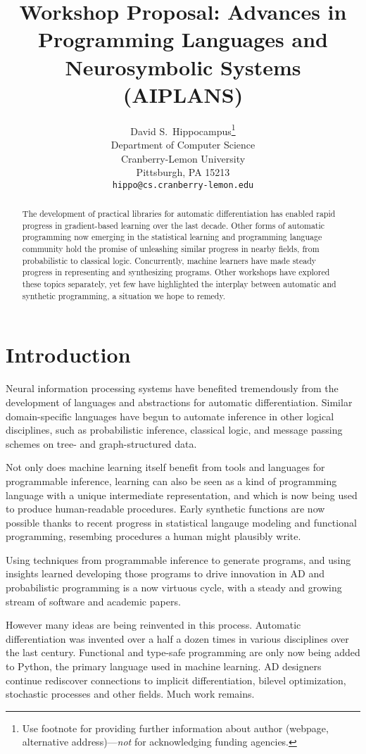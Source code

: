 \documentclass{article}
\title{Workshop Proposal: Advances in Programming Languages and Neurosymbolic Systems (AIPLANS)}
\author{%
    David S.~Hippocampus\thanks{Use footnote for providing further information
    about author (webpage, alternative address)---\emph{not} for acknowledging
    funding agencies.} \\
    Department of Computer Science\\
    Cranberry-Lemon University\\
    Pittsburgh, PA 15213 \\
    \texttt{hippo@cs.cranberry-lemon.edu} \\
}
\begin{document}
    \maketitle

    \begin{abstract}
        The development of practical libraries for automatic differentiation has enabled rapid progress in gradient-based learning over the last decade. Other forms of automatic programming now emerging in the statistical learning and programming language community hold the promise of unleashing similar progress in nearby fields, from probabilistic to classical logic. Concurrently, machine learners have made steady progress in representing and synthesizing programs. Other workshops have explored these topics separately, yet few have highlighted the interplay between automatic and synthetic programming, a situation we hope to remedy.
    \end{abstract}

    \section{Introduction}

    Neural information processing systems have benefited tremendously from the development of languages and abstractions for automatic differentiation. Similar domain-specific languages have begun to automate inference in other logical disciplines, such as probabilistic inference, classical logic, and message passing schemes on tree- and graph-structured data.

    Not only does machine learning itself benefit from tools and languages for programmable inference, learning can also be seen as a kind of programming language with a unique intermediate representation, and which is now being used to produce human-readable procedures. Early synthetic functions are now possible thanks to recent progress in statistical langauge modeling and functional programming, resembing procedures a human might plausibly write.

    Using techniques from programmable inference to generate programs, and using insights learned developing those programs to drive innovation in AD and probabilistic programming is a now virtuous cycle, with a steady and growing stream of software and academic papers.

    However many ideas are being reinvented in this process. Automatic differentiation was invented over a half a dozen times in various disciplines over the last century. Functional and type-safe programming are only now being added to Python, the primary language used in machine learning. AD designers continue rediscover connections to implicit differentiation, bilevel optimization, stochastic processes and other fields. Much work remains.
\end{document}
